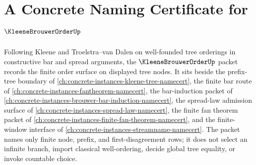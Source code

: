 \chapter{A Concrete Naming Certificate for $\KleeneBrouwerOrderUp$}
\label{ch:concrete-instances-kleene-brouwer-order-namecert}

Following Kleene and Troelstra--van Dalen on well-founded tree orderings in constructive bar and spread arguments, the $\KleeneBrouwerOrderUp$ packet records the finite order surface on displayed tree nodes. It sits beside the prefix-tree boundary of \autoref{ch:concrete-instances-kleene-tree-namecert}, the finite bar route of \autoref{ch:concrete-instances-fantheorem-namecert}, the bar-induction packet of \autoref{ch:concrete-instances-brouwer-bar-induction-namecert}, the spread-law admission surface of \autoref{ch:concrete-instances-spread-law-namecert}, the finite fan theorem packet of \autoref{ch:concrete-instances-finite-fan-theorem-namecert}, and the finite-window interface of \autoref{ch:concrete-instances-streamname-namecert}. The packet names only finite node, prefix, and first-disagreement rows; it does not select an infinite branch, import classical well-ordering, decide global tree equality, or invoke countable choice.

